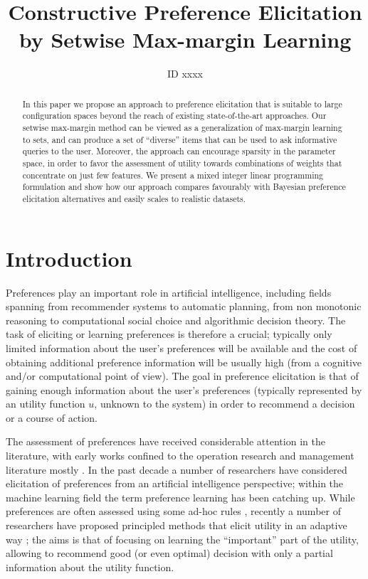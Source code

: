 \documentclass{article}
\title{Constructive Preference Elicitation by Setwise Max-margin Learning} %
\author{ID xxxx}
\renewcommand\[{\begin{equation}}
\renewcommand\]{\end{equation}}
\begin{document}
\maketitle

\begin{abstract}
  In this paper we propose an approach to preference elicitation that
  is suitable to large configuration spaces beyond the reach of
  existing state-of-the-art approaches. Our setwise max-margin method
  can be viewed as a generalization of max-margin learning to sets,
  and can produce a set of ``diverse'' items that can be used to ask
  informative queries to the user.  Moreover, the approach can
  encourage sparsity in the parameter space, in order to favor the
  assessment of utility towards combinations of weights that
  concentrate on just few features.  We present a mixed integer linear
  programming formulation and show how our approach compares
  favourably with Bayesian preference elicitation alternatives and
  easily scales to realistic datasets.
\end{abstract}

\section{Introduction}

Preferences \cite{Peintner2008} play an important role in artificial intelligence,
including fields spanning from recommender systems to automatic planning, 
from non monotonic reasoning to computational social choice and algorithmic decision theory.
The task of eliciting or learning preferences is therefore a crucial; typically only limited information about the user's preferences will be available and the cost of obtaining additional preference information will be usually high (from a cognitive and/or computational point of view).
The goal in preference elicitation is that of gaining enough information about the user's preferences (typically represented by an utility function $u$, unknown to the system) in order to recommend a decision or a course of action.

The assessment of preferences have received considerable attention in the literature, with early works confined to the operation research and management literature mostly \cite{}.
In the past decade a number of researchers have considered elicitation of preferences from an artificial intelligence perspective; within the machine learning field the term preference learning has been catching up.
While preferences are often assessed using some ad-hoc rules \cite{},
recently a number of researchers have proposed principled methods that elicit utility in an adaptive way \cite{chajewska2000,boutilier2002,Wang2003,boutilier2006,braziunas-mmr:uai07,guo2010real,viappiani2010optimal}; the aims is that of focusing on learning the ``important'' part of the utility, allowing to recommend good (or even optimal) decision with only a partial information about the utility function.
\end{document}

